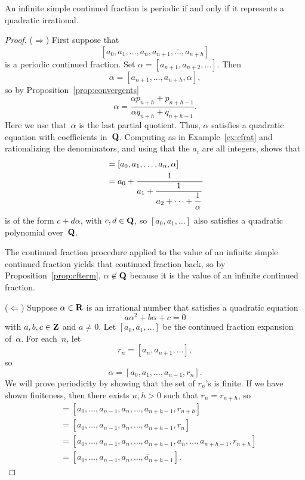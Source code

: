 \begin{theorem}
An infinite simple continued fraction is periodic if and only if
it represents a quadratic irrational.
\end{theorem}
\begin{proof}
\par\noindent($\Longrightarrow$) First suppose that
$$[a_0, a_1, \ldots, a_n, \overline{a_{n+1},\ldots, a_{n+h}}]$$
is a periodic continued fraction.  Set
 $\alpha=[a_{n+1},a_{n+2}, \ldots]$.  Then
$$
  \alpha = [a_{n+1},\ldots, a_{n+h}, \alpha],
$$
so by Proposition~\ref{prop:convergents}
$$
  \alpha = \frac{\alpha p_{n+h} + p_{n+h-1}}{\alpha q_{n+h} + q_{n+h-1}}.
$$
Here we use that~$\alpha$ is the last partial quotient.
Thus, $\alpha$ satisfies a quadratic equation with coefficients
in~$\mathbf{Q}$.  Computing as in Example~\ref{ex:cfrat} and rationalizing
the denominators, and using that the $a_i$ are
all integers, shows that
\begin{align*}
 [a_0, a_1, \ldots ] &= [a_0, a_1, \ldots, a_n, \alpha]\\
     &= a_0 + \frac{1}{\ds a_1 + \frac{1}{\ds a_2 + \cdots + \frac{1}{\alpha}}}
\end{align*}
is of the form $c+d\alpha$, with $c,d\in\mathbf{Q}$,
so $[a_0, a_1, \ldots]$ also satisfies a quadratic polynomial
over~$\mathbf{Q}$.

The continued fraction procedure
applied to the value of an infinite simple continued fraction
yields that continued fraction back, so
by Proposition~\ref{prop:cfterm}, $\alpha\not\in\mathbf{Q}$ because it is the
value of an infinite continued fraction.
\vspace{2ex}

\par\noindent($\Longleftarrow$)
Suppose $\alpha\in\mathbf{R}$ is an irrational number that satisfies a quadratic equation
\begin{equation}\label{eqn:quad_contfrac}
a \alpha^2 + b\alpha + c = 0
\end{equation}
with $a, b, c\in\mathbf{Z}$ and $a\neq 0$.
Let $[a_0, a_1, \ldots]$ be the continued fraction
expansion of~$\alpha$.  For each~$n$, let
$$
  r_n = [a_n, a_{n+1}, \ldots],
$$
so
$$
   \alpha = [a_0, a_1, \ldots, a_{n-1}, r_n].
$$
We will prove periodicity by showing that the set of $r_n$'s is
finite.  If we have shown finiteness, then there exists $n, h>0$
such that $r_n = r_{n+h}$, so
\begin{align*}
[a_0, \ldots, a_{n-1}, r_n] &=
   [a_0, \ldots, a_{n-1}, a_n, \ldots, a_{n+h-1}, r_{n+h}] \\
         &= [a_0, \ldots, a_{n-1}, a_n, \ldots, a_{n+h-1}, r_{n}]\\
         &= [a_0, \ldots, a_{n-1}, a_n, \ldots, a_{n+h-1}, a_n, \ldots, a_{n+h-1}, r_{n+h}]\\
         &= [a_0, \ldots, a_{n-1}, \overline{a_n, \ldots, a_{n+h-1}}].
\end{align*}


\end{proof}
